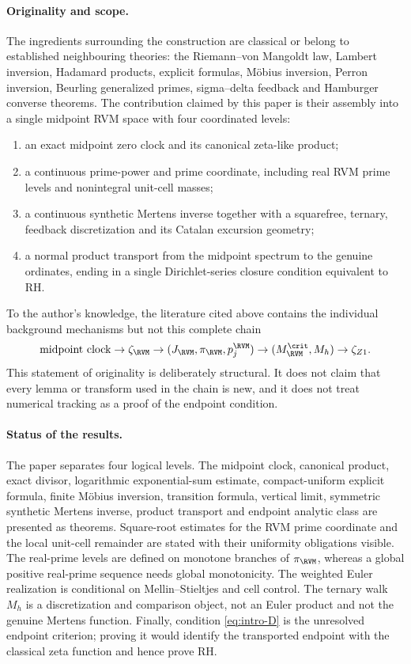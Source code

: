 \paragraph{Originality and scope.}
The ingredients surrounding the construction are classical or belong to
established neighbouring theories: the Riemann--von Mangoldt law, Lambert
inversion, Hadamard products, explicit formulas, M\"obius inversion, Perron
inversion, Beurling generalized primes, sigma--delta feedback and Hamburger
converse theorems.  The contribution claimed by this paper is their assembly
into a single midpoint RVM space with four coordinated levels:
\begin{enumerate}[label=\textup{(\roman*)}]
 \item an exact midpoint zero clock and its canonical zeta-like product;
 \item a continuous prime-power and prime coordinate, including real RVM
       prime levels and nonintegral unit-cell masses;
 \item a continuous synthetic Mertens inverse together with a squarefree,
       ternary, feedback discretization and its Catalan excursion geometry;
 \item a normal product transport from the midpoint spectrum to the genuine
       ordinates, ending in a single Dirichlet-series closure condition
       equivalent to RH.
\end{enumerate}
To the author's knowledge, the literature cited above contains the individual
background mechanisms but not this complete chain
\[
 \text{midpoint clock}
 \to \zeta_{\RVM}
 \to (J_{\RVM},\pi_{\RVM},p_j^{\RVM})
 \to (M_{\RVM}^{\crit},M_h)
 \to \zeta_{Z1}.
\]
This statement of originality is deliberately structural.  It does not claim
that every lemma or transform used in the chain is new, and it does not treat
numerical tracking as a proof of the endpoint condition.

\paragraph{Status of the results.}
The paper separates four logical levels.  The midpoint clock, canonical
product, exact divisor, logarithmic exponential-sum estimate, compact-uniform
explicit formula, finite M\"obius inversion, transition formula, vertical
limit, symmetric synthetic Mertens inverse, product transport and endpoint
analytic class are presented as theorems.  Square-root estimates for the RVM
prime coordinate and the local unit-cell remainder are stated with their
uniformity obligations visible.  The real-prime levels are defined on monotone
branches of $\pi_{\RVM}$, whereas a global positive real-prime sequence needs
global monotonicity.  The weighted Euler realization is conditional on
Mellin--Stieltjes and cell control.  The ternary walk $M_h$ is a discretization
and comparison object, not an Euler product and not the genuine Mertens
function.  Finally, condition \eqref{eq:intro-D} is the unresolved endpoint
criterion; proving it would identify the transported endpoint with the
classical zeta function and hence prove RH.

